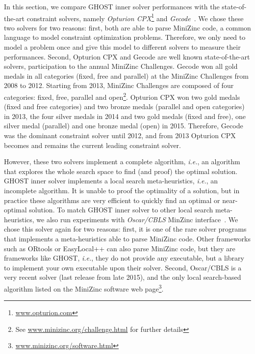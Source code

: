 \documentclass[journal]{IEEEtran}
\newcommand{\ghost}{\textsc{GHOST}\xspace}
\newcommand{\ie}{\textit{i.e.}}
\begin{document}
In this section, we compare  \ghost inner solver performances with the
state-of-the-art  constraint solvers,  namely {\it  Opturion CPX}\footnote{\href{http://www.opturion.com}{www.opturion.com}}  and
{\it Gecode}~\cite{gecode}.  We chose these  two solvers  for two reasons:  first, both
are able to parse MiniZinc code, a common language to model constraint
optimization problems. Therefore, we only need to model a problem once
and  give   this  model   to  different   solvers  to   measure  their
performances.   Second,   Opturion   CPX   and  Gecode   are   well   known
state-of-the-art  solvers,   participation  to  the   annual  MiniZinc
Challenges.   Gecode won  all gold  medals in  all categories  (fixed,
free and parallel) at the
MiniZinc Challenges from  2008 to 2012.  Starting  from 2013, MiniZinc
Challenges are composed of four  categories: fixed, free, parallel and
open\footnote{See
  \href{http://www.minizinc.org/challenge.html}{www.minizinc.org/challenge.html}
  for further details}. Opturion CPX won two gold
medals (fixed  and free  categories) and  two bronze  medals (parallel
and open categories)  in 2013, the four silver medals  in 2014 and two
gold  medals (fixed  and free),  one silver  medal (parallel)  and one
bronze  medal  (open) in  2015.  Therefore,  Gecode was  the  dominant
constraint solver until  2012, and from 2013 Opturion  CPX becomes and
remains the current leading constraint solver.

However, these  two solvers implement  a complete algorithm,  \ie, an
algorithm that explores  the whole  search space to  find (and  proof) the
optimal  solution.   \ghost inner  solver  implements  a local  search
meta-heuristics, \ie, an  incomplete algorithm. It is  unable to proof
the optimality  of a  solution, but in  practice these  algorithms are
very efficient to quickly find an optimal or near-optimal solution. To
match \ghost inner solver to other local search meta-heuristics, we
also run experiments  with {\it  Oscar/CBLS} MinZinc interface~\cite{oscar}.   We chose
this solver  again for two  reasons: first, it is  one of the  rare solver
programs that implements   a  meta-heuristics  able  to   parse  MiniZinc
code. Other frameworks such as  ORtools or EasyLocal++ can also parse
MiniZinc code,  but they are frameworks like  \ghost, \ie, they  do not
provide  any   executable,  but a library  to   implement  your  own
executable upon their solver.
Second, Oscar/CBLS is  a very recent
solver (last release from late  2015), and the only local search-based
algorithm     listed     on      the     MiniZinc     software     web
page\footnote{\href{http://www.minizinc.org/software.html}{www.minizinc.org/software.html}}.
\end{document}
